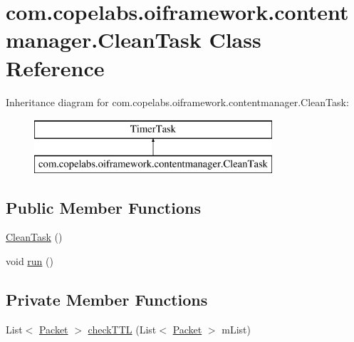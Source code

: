 \hypertarget{classcom_1_1copelabs_1_1oiframework_1_1contentmanager_1_1_clean_task}{}\section{com.\+copelabs.\+oiframework.\+contentmanager.\+Clean\+Task Class Reference}
\label{classcom_1_1copelabs_1_1oiframework_1_1contentmanager_1_1_clean_task}
Inheritance diagram for com.\+copelabs.\+oiframework.\+contentmanager.\+Clean\+Task\+:\begin{figure}[H]
\begin{center}
\leavevmode
\includegraphics[height=2.000000cm]{classcom_1_1copelabs_1_1oiframework_1_1contentmanager_1_1_clean_task}
\end{center}
\end{figure}
\subsection*{Public Member Functions}
\begin{DoxyCompactItemize}
\item 
\hyperlink{classcom_1_1copelabs_1_1oiframework_1_1contentmanager_1_1_clean_task_a99d62770336a1a3c7ce817c9fbda36cb}{Clean\+Task} ()
\item 
void \hyperlink{classcom_1_1copelabs_1_1oiframework_1_1contentmanager_1_1_clean_task_a357dd2b4ddc2922255cd5ec197a85e39}{run} ()
\end{DoxyCompactItemize}
\subsection*{Private Member Functions}
\begin{DoxyCompactItemize}
\item 
List$<$ \hyperlink{classcom_1_1copelabs_1_1oiframework_1_1contentmanager_1_1_packet}{Packet} $>$ \hyperlink{classcom_1_1copelabs_1_1oiframework_1_1contentmanager_1_1_clean_task_abfb7bdd58804ccde2a98d344a061ca99}{check\+T\+T\+L} (List$<$ \hyperlink{classcom_1_1copelabs_1_1oiframework_1_1contentmanager_1_1_packet}{Packet} $>$ m\+List)
\end{DoxyCompactItemize}
